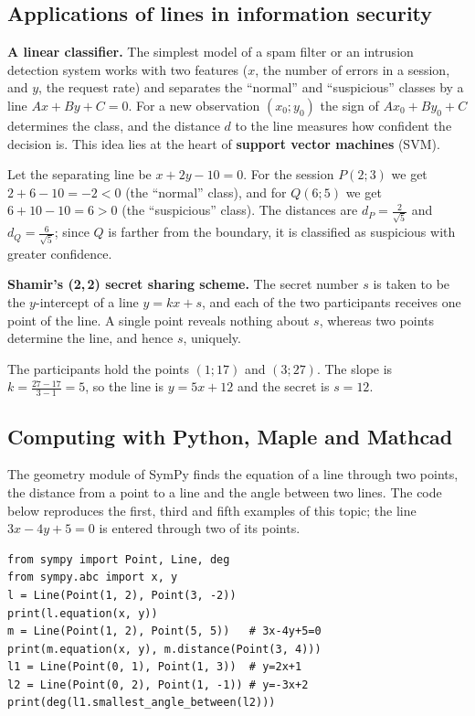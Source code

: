 \subsection{Applications of lines in information security}

\textbf{A linear classifier.} The simplest model of a spam filter or an
intrusion detection system works with two features ($x$, the number of
errors in a session, and $y$, the request rate) and separates the
“normal” and “suspicious” classes by a line $Ax+By+C=0$. For a new
observation $(x_0;y_0)$ the sign of $Ax_0+By_0+C$ determines the class,
and the distance $d$ to the line measures how confident the decision is.
This idea lies at the heart of \textbf{support vector machines} (SVM).

\begin{misol}
Let the separating line be $x+2y-10=0$. For the session $P(2;3)$ we get
$2+6-10=-2<0$ (the “normal” class), and for $Q(6;5)$ we get $6+10-10=6>0$
(the “suspicious” class). The distances are $d_P=\frac{2}{\sqrt5}$ and
$d_Q=\frac{6}{\sqrt5}$; since $Q$ is farther from the boundary, it is
classified as suspicious with greater confidence.
\end{misol}

\textbf{Shamir’s (2,\,2) secret sharing scheme.} The secret number $s$ is
taken to be the $y$-intercept of a line $y=kx+s$, and each of the two
participants receives one point of the line. A single point reveals
nothing about $s$, whereas two points determine the line, and hence $s$,
uniquely.

\begin{misol}
The participants hold the points $(1;17)$ and $(3;27)$. The slope is
$k=\frac{27-17}{3-1}=5$, so the line is $y=5x+12$ and the secret is $s=12$.
\end{misol}

\subsection{Computing with Python, Maple and Mathcad}

The geometry module of SymPy finds the equation of a line through two
points, the distance from a point to a line and the angle between two
lines. The code below reproduces the first, third and fifth examples of
this topic; the line $3x-4y+5=0$ is entered through two of its points.

\begin{Verbatim}[fontsize=\footnotesize,frame=single,label={\small Python}]
from sympy import Point, Line, deg
from sympy.abc import x, y
l = Line(Point(1, 2), Point(3, -2))
print(l.equation(x, y))
m = Line(Point(1, 2), Point(5, 5))   # 3x-4y+5=0
print(m.equation(x, y), m.distance(Point(3, 4)))
l1 = Line(Point(0, 1), Point(1, 3))  # y=2x+1
l2 = Line(Point(0, 2), Point(1, -1)) # y=-3x+2
print(deg(l1.smallest_angle_between(l2)))
\end{Verbatim}

